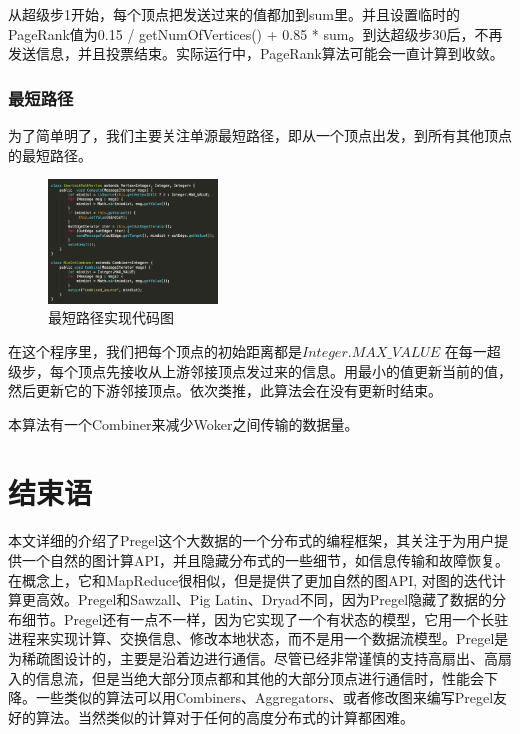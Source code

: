 \documentclass[10pt,a4paper,twocolumn,twoside,UTF8]{ctexart}
\begin{document}
	从超级步1开始，每个顶点把发送过来的值都加到sum里。并且设置临时的PageRank值为0.15 / getNumOfVertices() + 0.85 * sum。到达超级步30后，不再发送信息，并且投票结束。实际运行中，PageRank算法可能会一直计算到收敛。
	
	\subsubsection{最短路径}
	为了简单明了，我们主要关注单源最短路径，即从一个顶点出发，到所有其他顶点的最短路径。
	\begin{figure}[htbp]
		\centering
		\includegraphics[width=0.4\textwidth]{img//pic6.png}
		\caption{最短路径实现代码图}
		\label{pic6}
	\end{figure}
	
	在这个程序里，我们把每个顶点的初始距离都是$Integer.MAX\_VALUE$ 在每一超级步，每个顶点先接收从上游邻接顶点发过来的信息。用最小的值更新当前的值，然后更新它的下游邻接顶点。依次类推，此算法会在没有更新时结束。 \par
	本算法有一个Combiner来减少Woker之间传输的数据量。

\section{结束语}
	本文详细的介绍了Pregel这个大数据的一个分布式的编程框架，其关注于为用户提供一个自然的图计算API，并且隐藏分布式的一些细节，如信息传输和故障恢复。在概念上，它和MapReduce很相似，但是提供了更加自然的图API, 对图的迭代计算更高效。Pregel和Sawzall、Pig Latin、Dryad不同，因为Pregel隐藏了数据的分布细节。Pregel还有一点不一样，因为它实现了一个有状态的模型，它用一个长驻进程来实现计算、交换信息、修改本地状态，而不是用一个数据流模型。Pregel是为稀疏图设计的，主要是沿着边进行通信。尽管已经非常谨慎的支持高扇出、高扇入的信息流，但是当绝大部分顶点都和其他的大部分顶点进行通信时，性能会下降。一些类似的算法可以用Combiners、Aggregators、或者修改图来编写Pregel友好的算法。当然类似的计算对于任何的高度分布式的计算都困难。
	
	
\end{document}
